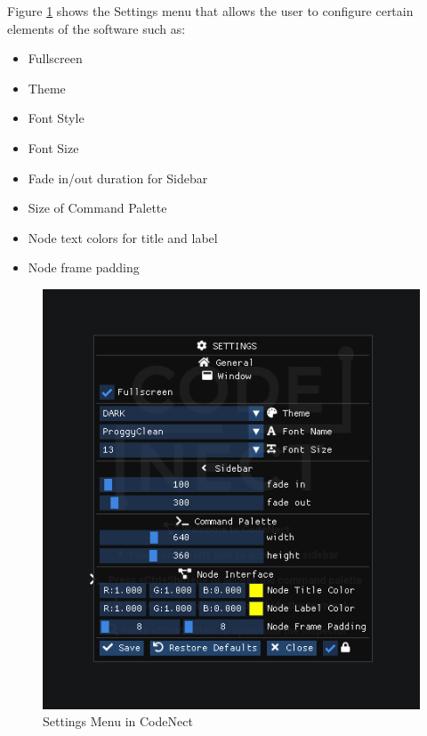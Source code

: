 \parx
Figure \ref{fig:cn_settings} shows the Settings menu that allows the user to configure
certain elements of the software such as:

\begin{itemize}
	\item Fullscreen
	\item Theme
	\item Font Style
	\item Font Size
	\item Fade in/out duration for Sidebar
	\item Size of Command Palette
	\item Node text colors for title and label
	\item Node frame padding
\end{itemize}

\begin{figure}[H]
	\centering
	\captionsetup{justification=centering}
	\captionsetup[figure]{list=yes}
	\includegraphics[width=\linewidth]{media/sc_settings.png}
	\caption[Settings Menu in CodeNect]{Settings Menu in CodeNect}
	\label{fig:cn_settings}
\end{figure}
